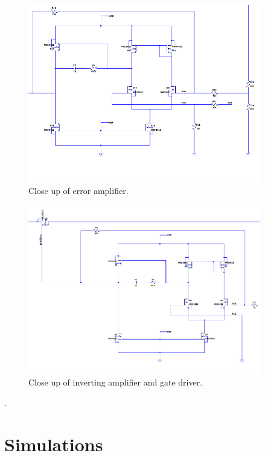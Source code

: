 \documentclass[10pt]{amsart}
\begin{document}
\begin{figure}[h]
	\begin{center}
		\includegraphics[width=4in]{Media/diff.png}
	\end{center}
	\caption{Close up of error amplifier.}
	\label{fig:pidfb}
\end{figure}

\begin{figure}[h]
	\begin{center}
		\includegraphics[width=4in]{Media/driver.png}
	\end{center}
	\caption{Close up of inverting amplifier and gate driver.}
	\label{fig:pidfb}
\end{figure}

   .
\newpage

  
\section{Simulations}
\end{document}
